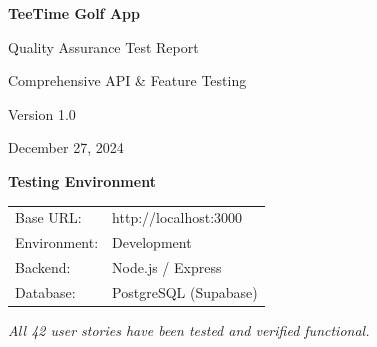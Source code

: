 \documentclass[11pt,a4paper]{article}
\begin{document}
\begin{titlepage}
  \centering
  \vspace*{1.5cm}
  {\Huge\bfseries\color{primary} TeeTime Golf App\par}
  \vspace{0.8cm}
  {\LARGE Quality Assurance Test Report\par}
  \vspace{1.5cm}
  {\Large Comprehensive API \& Feature Testing\par}
  \vspace{0.8cm}
  {\large Version 1.0\par}
  {\large December 27, 2024\par}
  \vspace{1.5cm}
  
  
  \vspace{1.5cm}
  {\large\textbf{Testing Environment}}\\[0.3cm]
  \begin{tabular}{l l}
  Base URL: & http://localhost:3000 \\
  Environment: & Development \\
  Backend: & Node.js / Express \\
  Database: & PostgreSQL (Supabase) \\
  \end{tabular}
  
  \vfill
  {\textit{All 42 user stories have been tested and verified functional.}\par}
\end{titlepage}

\tableofcontents
\newpage

\end{document}
